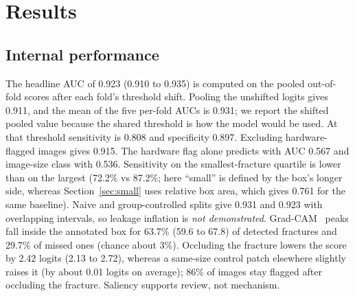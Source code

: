\documentclass[11pt]{article}
\begin{document}
\section{Results}
\subsection{Internal performance}
The headline AUC of 0.923 (0.910 to 0.935) is computed on the pooled out-of-fold scores after each fold's threshold shift. Pooling the unshifted logits gives 0.911, and the mean of the five per-fold AUCs is 0.931; we report the shifted pooled value because the shared threshold is how the model would be used. At that threshold sensitivity is 0.808 and specificity 0.897. Excluding hardware-flagged images gives 0.915. The hardware flag alone predicts with AUC 0.567 and image-size class with 0.536. Sensitivity on the smallest-fracture quartile is lower than on the largest (72.2\% vs 87.2\%; here ``small'' is defined by the box's longer side, whereas Section~\ref{sec:small} uses relative box area, which gives 0.761 for the same baseline). Naive and group-controlled splits give 0.931 and 0.923 with overlapping intervals, so leakage inflation is \emph{not demonstrated}.
Grad-CAM~\cite{Selvaraju_2020} peaks fall inside the annotated box for 63.7\% (59.6 to 67.8) of detected fractures and 29.7\% of missed ones (chance about 3\%). Occluding the fracture lowers the score by 2.42 logits (2.13 to 2.72), whereas a same-size control patch elsewhere slightly raises it (by about 0.01 logits on average); 86\% of images stay flagged after occluding the fracture. Saliency supports review, not mechanism.
\end{document}
